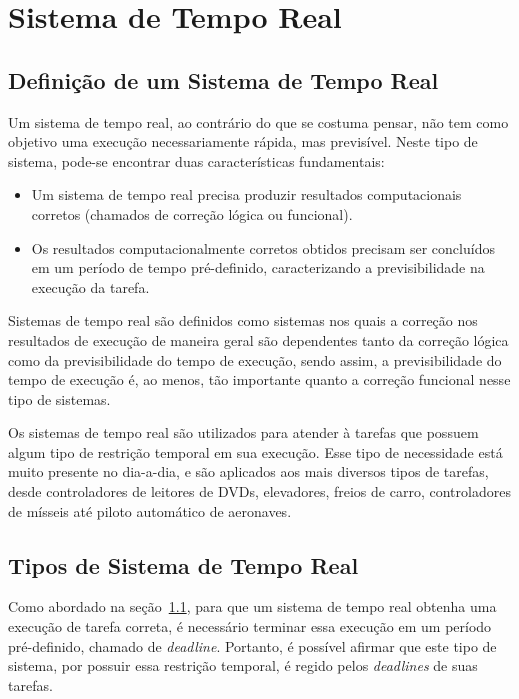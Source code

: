 \section{Sistema de Tempo Real}
\label{sec:STR}

\subsection{Definição de um Sistema de Tempo Real}
\label{sec:DefSTR}
Um sistema de tempo real, ao contrário do que se costuma pensar, não tem
como objetivo uma execução necessariamente rápida, mas previsível.
Neste tipo de sistema, pode-se encontrar duas características fundamentais:

\begin{itemize}
\item Um sistema de tempo real precisa produzir resultados computacionais corretos
(chamados de correção lógica ou funcional).
\item Os resultados computacionalmente corretos obtidos precisam ser concluídos em
um período de tempo pré-definido, caracterizando a previsibilidade na execução da tarefa.
\end{itemize}

Sistemas de tempo real são definidos como sistemas nos quais a correção nos
resultados de execução de maneira geral são dependentes tanto da correção
lógica como da previsibilidade do tempo de execução, sendo assim, a previsibilidade
do tempo de execução é, ao menos, tão importante quanto a correção funcional
nesse tipo de sistemas.~\cite{Li:2003:RCE:829584}

Os sistemas de tempo real são utilizados para atender à tarefas que possuem algum tipo
de restrição temporal em sua execução. Esse tipo de necessidade está muito presente no
dia-a-dia, e são aplicados aos mais diversos tipos de tarefas, desde controladores de
leitores de DVDs, elevadores, freios de carro, controladores de mísseis até piloto automático
de aeronaves.

\subsection{Tipos de Sistema de Tempo Real}
Como abordado na seção~\ref{sec:DefSTR}, para que um sistema de tempo real obtenha uma
execução de tarefa correta, é necessário terminar essa execução em um período pré-definido,
chamado de \textit{deadline}. Portanto, é possível afirmar que este tipo de sistema, por possuir
essa restrição temporal, é regido pelos \textit{deadlines} de suas tarefas.

